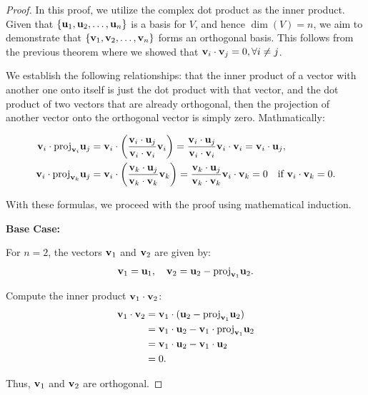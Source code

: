 \documentclass[12pt]{article}
\begin{document}
\begin{proof}
    In this proof, we utilize the complex dot product as the inner product. Given that \(\{\mathbf{u}_1, \mathbf{u}_2, \ldots, \mathbf{u}_n\}\) is a basis for \(V\), and hence \(\dim(V) = n\), we aim to demonstrate that \(\{\mathbf{v}_1, \mathbf{v}_2, \ldots, \mathbf{v}_n\}\) forms an orthogonal basis. This follows from the previous theorem where we showed that \(\mathbf{v}_i \cdot \mathbf{v}_j = 0, \forall i \neq j\).

    We establish the following relationships: that the inner product of a vector with another one onto itself is just the dot product with that vector, and the dot product of two vectors that are already orthogonal, then the projection of another vector onto the orthogonal vector is simply zero. Mathmatically:

    \begin{align}
        \mathbf{v}_i \cdot \text{proj}_{\mathbf{v}_i}{\mathbf{u}_j} &= \mathbf{v}_i \cdot \left(\frac{\mathbf{v}_i \cdot \mathbf{u}_j}{\mathbf{v}_i \cdot \mathbf{v}_i}\mathbf{v}_i\right) = \frac{\mathbf{v}_i \cdot \mathbf{u}_j}{\mathbf{v}_i \cdot \mathbf{v}_i}\mathbf{v}_i \cdot \mathbf{v}_i = \mathbf{v}_i \cdot \mathbf{u}_j,  \\
        \mathbf{v}_i \cdot \text{proj}_{\mathbf{v}_k}{\mathbf{u}_j} &= \mathbf{v}_i \cdot \left(\frac{\mathbf{v}_k \cdot \mathbf{u}_j}{\mathbf{v}_k \cdot \mathbf{v}_k}\mathbf{v}_k\right) = \frac{\mathbf{v}_k \cdot \mathbf{u}_j}{\mathbf{v}_k \cdot \mathbf{v}_k}\mathbf{v}_i \cdot \mathbf{v}_k = 0 \quad \text{if } \mathbf{v}_i \cdot \mathbf{v}_k = 0.
    \end{align}

    With these formulas, we proceed with the proof using mathematical induction.

    \textbf{Base Case:}

    For \(n = 2\), the vectors \(\mathbf{v}_1\) and \(\mathbf{v}_2\) are given by:
    \[
    \mathbf{v}_1 = \mathbf{u}_1, \quad \mathbf{v}_2 = \mathbf{u}_2 - \text{proj}_{\mathbf{v}_1}{\mathbf{u}_2}.
    \]

    Compute the inner product \(\mathbf{v}_1 \cdot \mathbf{v}_2\):
    \begin{align*}
        \mathbf{v}_1 \cdot \mathbf{v}_2 &= \mathbf{v}_1 \cdot (\mathbf{u}_2 - \text{proj}_{\mathbf{v}_1}{\mathbf{u}_2}) \\
        &= \mathbf{v}_1 \cdot \mathbf{u}_2 - \mathbf{v}_1 \cdot \text{proj}_{\mathbf{v}_1}{\mathbf{u}_2} \\
        &= \mathbf{v}_1 \cdot \mathbf{u}_2 - \mathbf{v}_1 \cdot \mathbf{u}_2 \\
        &= 0.
    \end{align*}

    Thus, \(\mathbf{v}_1\) and \(\mathbf{v}_2\) are orthogonal.


\end{proof}
\end{document}

